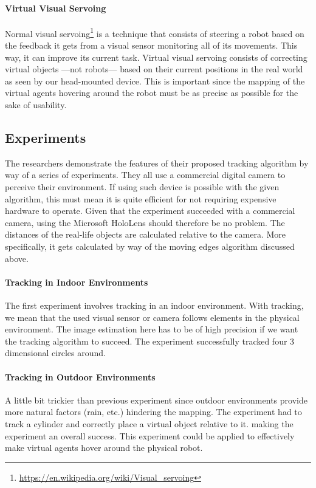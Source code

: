 \paragraph{Virtual Visual Servoing}
Normal visual servoing\footnote{\url{https://en.wikipedia.org/wiki/Visual\_servoing}} is a technique that consists of steering a robot based on the feedback it gets from a visual sensor monitoring all of its movements. This way, it can improve its current task.
Virtual visual servoing consists of correcting virtual objects ---not robots--- based on their current positions in the real world as seen by our head-mounted device. This is important since the mapping of the virtual agents hovering around the robot must be as precise as possible for the sake of usability.

\subsection{Experiments}
The researchers demonstrate the features of their proposed tracking algorithm by way of a series of experiments\cite{comport2003real}. They all use a commercial digital camera to perceive their environment. If using such device is possible with the given algorithm, this must mean it is quite efficient for not requiring expensive hardware to operate\cite{kruijff2010perceptual}. Given that the experiment succeeded with a commercial camera, using the Microsoft HoloLens should therefore be no problem. The distances of the real-life objects are calculated relative to the camera. More specifically, it gets calculated by way of the moving edges algorithm discussed above.

\paragraph{Tracking in Indoor Environments}
The first experiment involves tracking in an indoor environment. With tracking, we mean that the used visual sensor or camera follows elements in the physical environment. The image estimation here has to be of high precision if we want the tracking algorithm to succeed. The experiment successfully tracked  four 3 dimensional circles around. 

\paragraph{Tracking in Outdoor Environments}
A little bit trickier than previous experiment since outdoor environments provide more natural factors (rain, etc.) hindering the mapping. The experiment had to track a cylinder and correctly place a virtual object relative to it.  making the experiment an overall success. This experiment could be applied to effectively make virtual agents hover around the physical robot.

